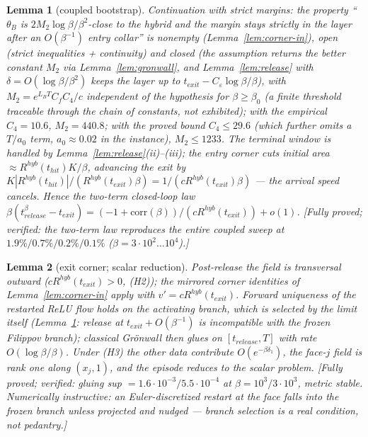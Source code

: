 \documentclass[11pt]{article}
\newtheorem{lemma}{Lemma}
\begin{document}
\begin{lemma}[coupled bootstrap]\label{lem:bootstrap}
Continuation with strict margins: the property ``$\theta_B$ is
$2M_2\log\beta/\beta^2$-close to the hybrid and the margin stays strictly in
the layer after an $O(\beta^{-1})$ entry collar'' is nonempty (Lemma~\ref{lem:corner-in}), open (strict inequalities
+ continuity) and closed (the assumption returns the better constant $M_2$
via Lemma~\ref{lem:gronwall}, and Lemma~\ref{lem:release} with
$\delta=O(\log\beta/\beta^2)$ keeps the layer up to
$t_{exit}-C_\varepsilon\log\beta/\beta$), with $M_2=e^{L_BT}C_fC_4/c$
independent of the hypothesis for $\beta\ge\beta_0$ (a finite threshold traceable
through the chain of constants, not exhibited); with the empirical $C_4=10.6$,
$M_2=440.8$; with the proved bound $C_4\le29.6$ (which further omits a
$T/a_0$ term, $a_0\approx0.02$ in the instance), $M_2\le1233$. The terminal window is handled by
Lemma~\ref{lem:release}(ii)--(iii); the entry corner cuts initial area
$\approx R^{hyb}(t_{hit})K/\beta$, advancing the exit by
$K|R^{hyb}(t_{hit})|/(R^{hyb}(t_{exit})\beta)=1/(cR^{hyb}(t_{exit})\beta)$ ---
the arrival speed cancels. Hence the two-term closed-loop law
$\beta(t^\beta_{release}-t_{exit})=(-1+\mathrm{corr}(\beta))/(cR^{hyb}(t_{exit}))+o(1)$.
[Fully proved; verified: the two-term law reproduces the entire coupled sweep
at $1.9\%/0.7\%/0.2\%/0.1\%$ ($\beta=3\cdot10^2\ldots10^4$).]
\end{lemma}

\begin{lemma}[exit corner; scalar reduction]\label{lem:corner-out}
Post-release the field is transversal outward ($cR^{hyb}(t_{exit})>0$, (H2));
the mirrored corner identities of Lemma~\ref{lem:corner-in} apply with
$v'=cR^{hyb}(t_{exit})$. Forward uniqueness of the restarted ReLU flow holds on
the \emph{activating branch}, which is selected by the limit itself
(Lemma~\ref{lem:bootstrap}: release at $t_{exit}+O(\beta^{-1})$ is incompatible
with the frozen Filippov branch); classical Gr\"onwall then glues on
$[t_{release},T]$ with rate $O(\log\beta/\beta)$. Under (H3) the other data
contribute $O(e^{-\beta\delta_1})$, the face-$j$ field is rank one along
$(x_j,1)$, and the episode reduces to the scalar problem. [Fully proved;
verified: gluing sup $=1.6\cdot10^{-3}/5.5\cdot10^{-4}$ at $\beta=10^3/3\cdot10^3$,
metric stable. Numerically instructive: an Euler-discretized restart at the face
falls into the frozen branch unless projected and nudged --- branch selection is
a real condition, not pedantry.]
\end{lemma}
\end{document}
